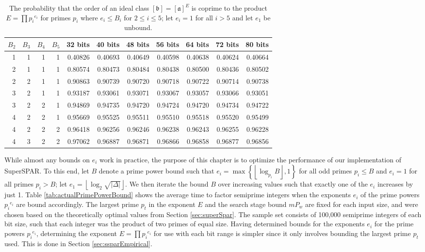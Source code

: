 \documentclass{ucalgthes1}
\theoremstyle{definition}
\DeclareMathOperator{\ord}{ord}
\newcommand{\floor}[1]{\left\lfloor #1 \right\rfloor}
\newcommand{\ideal}{\mathfrak}
\newcommand{\idealclass}[1]{\left[ \ideal #1 \right]}
\newcommand{\aclass}{\idealclass a}
\newcommand{\bclass}{\idealclass b}
\newcommand{\hdelta}{\sqrt{|\Delta|}}
\begin{document}
\begin{table}[htb]
\centering
\begin{tabular}{| r r r r || r | r | r | r | r | r | r |}
	\hline
$B_2$ & $B_3$ & $B_4$ & $B_5$ & 32 bits & 40 bits & 48 bits & 56 bits & 64 bits & 72 bits & 80 bits \\
\hline
1 & 1 & 1 & 1 & 0.40826 & 0.40693 & 0.40649 & 0.40598 & 0.40638 & 0.40624 & 0.40664 \\
2 & 1 & 1 & 1 & 0.80574 & 0.80473 & 0.80484 & 0.80438 & 0.80500 & 0.80436 & 0.80502 \\
2 & 2 & 1 & 1 & 0.90863 & 0.90739 & 0.90720 & 0.90718 & 0.90722 & 0.90714 & 0.90738 \\
3 & 2 & 1 & 1 & 0.93187 & 0.93061 & 0.93071 & 0.93067 & 0.93057 & 0.93066 & 0.93051 \\
3 & 2 & 2 & 1 & 0.94869 & 0.94735 & 0.94720 & 0.94724 & 0.94720 & 0.94734 & 0.94722 \\
4 & 2 & 2 & 1 & 0.95669 & 0.95525 & 0.95511 & 0.95510 & 0.95518 & 0.95520 & 0.95499 \\
4 & 2 & 2 & 2 & 0.96418 & 0.96256 & 0.96246 & 0.96238 & 0.96243 & 0.96255 & 0.96228 \\
4 & 3 & 2 & 2 & 0.97062 & 0.96887 & 0.96871 & 0.96866 & 0.96858 & 0.96877 & 0.96856 \\	
	\hline
\end{tabular}
\caption[The probability that $\ord(\aclass^E)$ is coprime to $E$.]{The probability that the order of an ideal class $\bclass = \aclass ^ E$ is coprime to the product $E = \prod {p_i}^{e_i}$ for primes $p_i$ where $e_i \le B_i$ for $2 \le i \le 5$; let $e_i = 1$ for all $i > 5$ and let $e_1$ be unbound.}
\label{tab:primePowerBound}
\end{table}

While almost any bounds on $e_i$ work in practice, the purpose of this chapter is to optimize the performance of our implementation of SuperSPAR.  To this end, let $B$ denote a prime power bound such that $e_i = \max \left\{ \floor{\log_{p_i} B}, 1 \right\}$ for all odd primes $p_i \le B$ and $e_i = 1$ for all primes $p_i > B$; let $e_1 = \floor{\log_2 \hdelta}$.  We then iterate the bound $B$ over increasing values such that exactly one of the $e_i$ increases by just 1.  Table \ref{tab:actualPrimePowerBound} shows the average time to factor semiprime integers when the exponents $e_i$ of the prime powers ${p_i}^{e_i}$ are bound accordingly.  The largest prime $p_t$ in the exponent $E$ and the search stage bound $mP_w$ are fixed for each input size, and were chosen based on the theoretically optimal values from Section \ref{sec:superSpar}.  The sample set consists of 100,000 semiprime integers of each bit size, such that each integer was the product of two primes of equal size.  Having determined bounds for the exponents $e_i$ for the prime powers ${p_i}^{e_i}$, determining the exponent $E = \prod {p_i}^{e_i}$ for use with each bit range is simpler since it only involves bounding the largest prime $p_t$ used.  This is done in Section \ref{sec:ssparEmpirical}.
\end{document}
